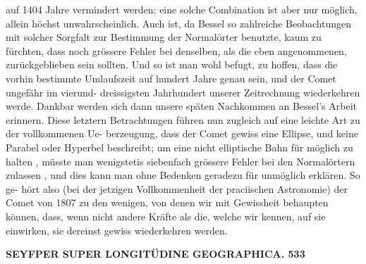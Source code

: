 \documentclass[12pt,a4paper]{article}
\begin{document}
auf  1404  Jahre  vermindert  werden;  eine  solche  Combination  ist  aber  nur  möglich, allein  höchst  unwahrscheinlich.  Auch  ist,  da  Bessel  so  zahlreiche  Beobachtungen  mit  solcher  Sorgfalt zur  Bestimmung  der  Normalörter  benutzte,  kaum  zu  fürchten,  dass  noch  grössere  Fehler  bei  denselben, als  die  eben  angenommenen,  zurückgeblieben  sein  sollten.  Und  so  ist  man  wohl  befugt,  zu  hoffen,  dass die  vorhin  bestimmte  Umlaufszeit  auf  hundert  Jahre  genau  sein,  und  der  Comet  ungefähr  im  vierund- dreissigsten  Jahrhundert  unserer  Zeitrechnung  wiederkehren  werde.  Dankbar  werden  sich  dann  unsere späten  Nachkommen  an  Bessel's  Arbeit  erinnern. Diese  letztern  Betrachtungen  führen  nun  zugleich  auf  eine  leichte  Art  zu  der  vollkommenen  Ue- berzeugung,  dass  der  Comet  gewiss  eine  Ellipse,  und  keine  Parabel  oder  Hyperbel  beschreibt;  um  eine nicht  elliptische  Bahn  für  möglich  zu  halten ,  müsste  man  wenigstetis  siebenfach  grössere  Fehler  bei  den Normalörtern  zulassen ,  und  dies  kann  man  ohne  Bedenken  geradezu  für  unmöglich  erklären.  So  ge- hört also  (bei  der  jetzigen  Vollkommenheit  der  praciischen  Astronomie)  der  Comet  von  1807  zu  den wenigen,  von  denen  wir  mit  Gewissheit  behaupten  können,  dass,  wenn  nicht  andere  Kräfte  als  die, welche  wir  kennen,  auf  sie  einwirken,  sie  dereinst  gewiss  wiederkehren  werden.

\vspace{0.5em}


\noindent\textbf{SEYFPER      SUPER  LONGITÜDINE  GEOGRAPHICA.  533}
\end{document}
